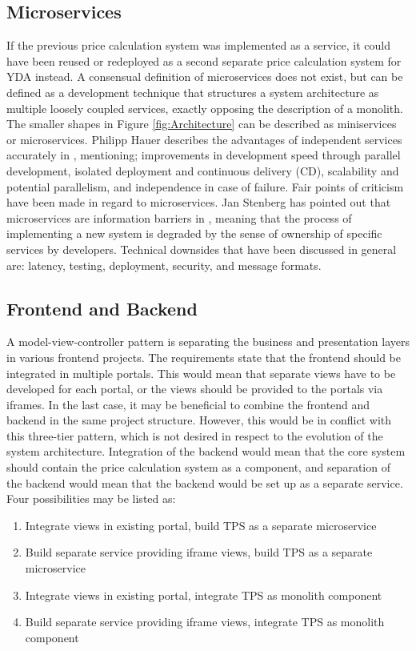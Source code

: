 \subsection{Microservices}
If the previous price calculation system was implemented as a service, it could have been reused or redeployed as a second separate price calculation system for YDA instead. A consensual definition of microservices does not exist, but can be defined as a development technique that structures a system architecture as multiple loosely coupled services, exactly opposing the description of a monolith. The smaller shapes in Figure \ref{fig:Architecture} can be described as miniservices or microservices. Philipp Hauer describes the advantages of independent services accurately in \cite{microservices}, mentioning; improvements in development speed through parallel development, isolated deployment and continuous delivery (CD), scalability and potential parallelism, and independence in case of failure. Fair points of criticism have been made in regard to microservices. Jan Stenberg has pointed out that microservices are information barriers in \cite{JS-microservices}, meaning that the process of implementing a new system is degraded by the sense of ownership of specific services by developers. Technical downsides that have been discussed in general are: latency, testing, deployment, security, and message formats.

\subsection{Frontend and Backend}
A model-view-controller pattern is separating the business and presentation layers in various frontend projects. The requirements state that the frontend should be integrated in multiple portals. This would mean that separate views have to be developed for each portal, or the views should be provided to the portals via iframes. In the last case, it may be beneficial to combine the frontend and backend in the same project structure. However, this would be in conflict with this three-tier pattern, which is not desired in respect to the evolution of the system architecture. Integration of the backend would mean that the core system should contain the price calculation system as a component, and separation of the backend would mean that the backend would be set up as a separate service. Four possibilities may be listed as:

\begin{enumerate}
	\item Integrate views in existing portal, build TPS as a separate microservice
	\item Build separate service providing iframe views, build TPS as a separate microservice
	\item Integrate views in existing portal, integrate TPS as monolith component
	\item Build separate service providing iframe views, integrate TPS as monolith component
\end{enumerate}

